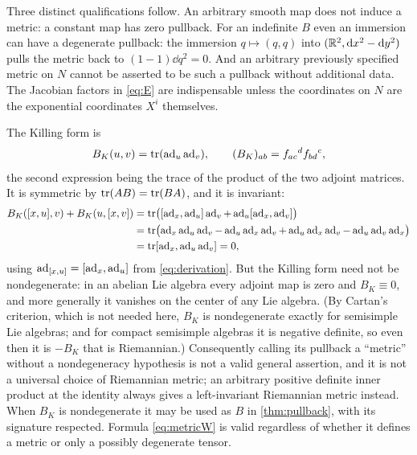 Three distinct qualifications follow. An arbitrary smooth map does not
induce a metric: a constant map has zero pullback. For an indefinite $B$
even an immersion can have a degenerate pullback: the immersion
$q\mapsto(q,q)$ into $(\mathbb{R}^2,\mathrm{d} x^2-\mathrm{d} y^2)$ pulls the metric back to
$(1-1)\dd q^2=0$. And an arbitrary previously specified metric on $N$
cannot be asserted to be such a pullback without additional data. The
Jacobian factors in \eqref{eq:E} are indispensable unless the coordinates
on $N$ are the exponential coordinates $X^i$ themselves.

The Killing form is
\begin{equation}\label{eq:killing}
 B_K(u,v)=\operatorname{tr}(\operatorname{ad}_u\operatorname{ad}_v),\qquad (B_K)_{ab}=f_{ac}{}^df_{bd}{}^c,
\end{equation}
the second expression being the trace of the product of the two adjoint
matrices. It is symmetric by $\operatorname{tr}(AB)=\operatorname{tr}(BA)$, and it is invariant:
\begin{align*}
 B_K([x,u],v)+B_K(u,[x,v])
 &=\operatorname{tr}\bigl([\operatorname{ad}_x,\operatorname{ad}_u]\operatorname{ad}_v+\operatorname{ad}_u[\operatorname{ad}_x,\operatorname{ad}_v]\bigr)\\
 &=\operatorname{tr}\bigl(\operatorname{ad}_x\operatorname{ad}_u\operatorname{ad}_v-\operatorname{ad}_u\operatorname{ad}_x\operatorname{ad}_v+\operatorname{ad}_u\operatorname{ad}_x\operatorname{ad}_v-\operatorname{ad}_u\operatorname{ad}_v\operatorname{ad}_x\bigr)\\
 &=\operatorname{tr}[\operatorname{ad}_x,\operatorname{ad}_u\operatorname{ad}_v]=0,
\end{align*}
using $\operatorname{ad}_{[x,u]}=[\operatorname{ad}_x,\operatorname{ad}_u]$ from \eqref{eq:derivation}. But the
Killing form need not be nondegenerate: in an abelian Lie algebra every
adjoint map is zero and $B_K\equiv0$, and more generally it vanishes on
the center of any Lie algebra. (By Cartan's criterion, which is not needed
here, $B_K$ is nondegenerate exactly for semisimple Lie algebras; and for
compact semisimple algebras it is negative definite, so even then it is
$-B_K$ that is Riemannian.) Consequently calling its pullback a ``metric'' without a
nondegeneracy hypothesis is not a valid general assertion, and it is not a
universal choice of Riemannian metric; an arbitrary positive definite inner
product at the identity always gives a left-invariant Riemannian metric
instead. When $B_K$ is nondegenerate it may be used as $B$ in
\cref{thm:pullback}, with its signature respected. Formula
\eqref{eq:metricW} is valid regardless of whether it defines a metric or
only a possibly degenerate tensor.

